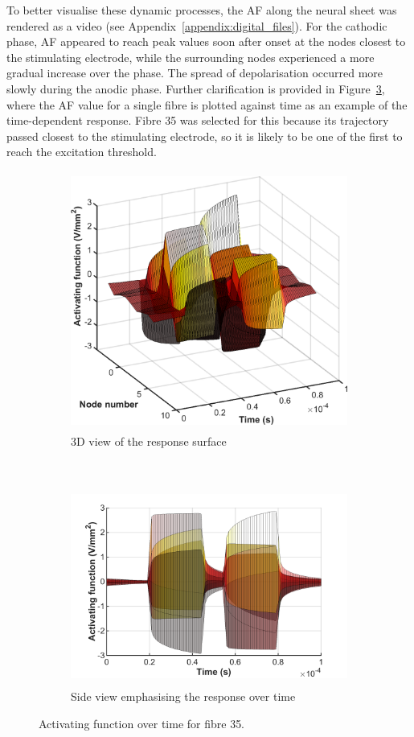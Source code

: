 To better visualise these dynamic processes, the AF along the neural sheet was
rendered as a video (see Appendix~\ref{appendix:digital_files}). For the
cathodic phase, AF appeared to reach peak values soon after onset at the nodes
closest to the stimulating electrode, while the surrounding nodes experienced a
more gradual increase over the phase. The spread of depolarisation occurred more
slowly during the anodic phase. Further clarification is provided in
Figure~\ref{fig:af_fibre_35}, where the AF value for a single fibre is plotted
against time as an example of the time-dependent response. Fibre 35 was selected
for this because its trajectory passed closest to the stimulating electrode, so
it is likely to be one of the first to reach the excitation threshold.

\begin{figure}
	\centering
	
	\begin{subfigure}[t]{\textwidth}
        \centering
		\includegraphics[height=8.5cm]{Simulations/TimeDep/AF_ramped_time_f35}
        \caption{3D view of the response surface}
        \label{fig:af_fibre35_3D}
    \end{subfigure}\\%
    \vspace{1em}%
    \begin{subfigure}[t]{\textwidth}
        \centering
		\includegraphics[height=6.5cm]{Simulations/TimeDep/AF_ramped_time_f35_side}
        \caption{Side view emphasising the response over time}
        \label{fig:af_fibre35_time}
    \end{subfigure}%
    
	\caption[Activating function over time]{Activating function over time for
	fibre 35.}
	\label{fig:af_fibre_35}
\end{figure}

